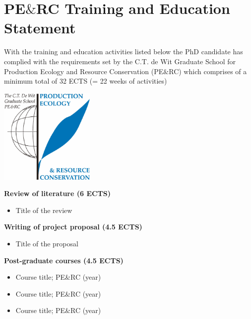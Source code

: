 \chapter{PE$\&$RC Training and Education Statement }

\begin{minipage}[c]{.55\textwidth}

With the training and education activities listed below the PhD candidate has complied with the requirements set by the C.T. de Wit Graduate School for Production Ecology and Resource Conservation (PE$\&$RC) which comprises of a minimum total of 32 ECTS (= 22 weeks of activities) 
\end{minipage}
\begin{minipage}[c]{.35\textwidth}
\begin{flushright}
\vspace{0pt}\includegraphics[width=4.6cm,height=4.6cm]{PERC_logo.pdf}
\end{flushright}
\end{minipage}%

\bigskip

\textbf{Review of literature (6 ECTS)}
\begin{itemize}[nolistsep]
    \item Title of the review
\end{itemize}

\textbf{Writing of project proposal (4.5 ECTS)}
\begin{itemize}[nolistsep]
    \item Title of the proposal
\end{itemize}

\textbf{Post-graduate courses (4.5 ECTS)}
\begin{itemize}[nolistsep]
    \item Course title; PE\&RC (year)
    \item Course title; PE\&RC (year)
    \item Course title; PE\&RC (year)
\end{itemize}

